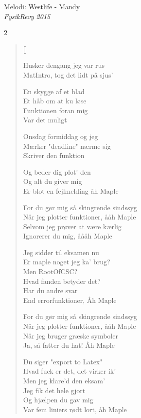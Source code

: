 {\newpage


{Melodi: Westlife - Mandy}\\[.2em]
{\small\itshape FysikRevy 2015}
\begin{multicols}2
\settowidth{\versewidth}{For du gør mig så skingrende sindssyg}
\begin{verse}[\versewidth]

Husker dengang jeg var rus\\
MatIntro, tog det lidt på sjus'

En skygge af et blad\\
Et håb om at ku løse\\
Funktionen foran mig\\
Var det muligt

Onsdag formiddag og jeg\\
Mærker "deadline" nærme sig\\
Skriver den funktion

Og beder dig plot' den\\
Og alt du giver mig\\
Er blot en fejlmelding åh Maple

For du gør mig så skingrende sindssyg\\
Når jeg plotter funktioner, ååh Maple\\
Selvom jeg prøver at være kærlig\\
Ignorerer du mig, åååh Maple

Jeg sidder til eksamen nu\\
Er maple noget jeg ka' brug?\\
Men RootOfCSC?\\
Hvad fanden betyder det?\\
Har du andre svar\\
End errorfunktioner, Åh Maple

For du gør mig så skingrende sindssyg\\
Når jeg plotter funktioner, ååh Maple\\
Når jeg bruger græske symboler\\
Ja, så fatter du hat! Åh Maple

Du siger "export to Latex"\\
Hvad fuck er det, det virker ik'\\
Men jeg klare'd den eksam'\\
Jeg fik det hele gjort\\
Og hjælpen du gav mig\\
Var fem liniers rødt lort, åh Maple


\end{verse}
\end{multicols}}
